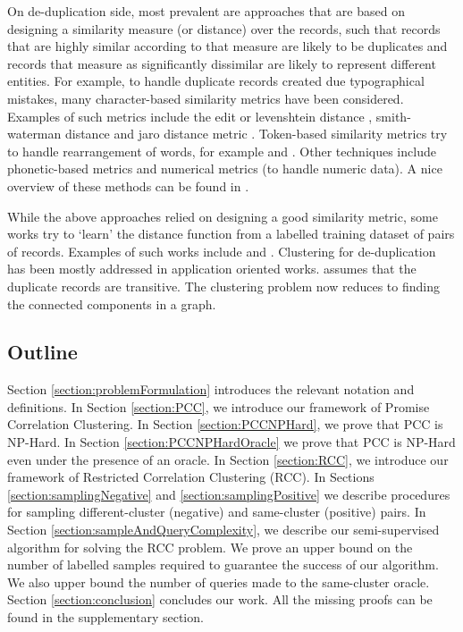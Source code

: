 \documentclass[12pt]{article}
\begin{document}
On de-duplication side, most prevalent are approaches that are based on designing a similarity measure (or distance) over the records, such that records that are highly similar according to that measure are likely to be duplicates and records that measure as significantly dissimilar are likely to represent different entities. For example, to handle duplicate records created due typographical mistakes, many character-based similarity metrics have been considered. Examples of such metrics include the edit or levenshtein distance \cite{levenshtein1966binary}, smith-waterman distance \cite{waterman1981identification} and jaro distance metric \cite{jaro1980unimatch}. Token-based similarity metrics try to handle rearrangement of words, for example \cite{monge1996field} and \cite{cohen1998integration}. Other techniques include phonetic-based metrics and numerical metrics (to handle numeric data). A nice overview of these methods can be found in \cite{elmagarmid2007duplicate}. 
   
While the above approaches relied on designing a good similarity metric, some works try to `learn' the distance function from a labelled training dataset of pairs of records. Examples of such works include \cite{cochinwala2001efficient} and \cite{bilenko2003adaptive}. Clustering for de-duplication has been mostly addressed in application oriented works. \cite{hernandez1995merge} assumes that the duplicate records are transitive. The clustering problem now reduces to finding the connected components in a graph. 

\subsection{Outline}
Section \ref{section:problemFormulation} introduces the relevant notation and definitions. In Section \ref{section:PCC}, we introduce our framework of Promise Correlation Clustering. In Section \ref{section:PCCNPHard}, we prove that PCC is NP-Hard. In Section \ref{section:PCCNPHardOracle} we prove that PCC is NP-Hard even under the presence of an oracle. In Section \ref{section:RCC}, we introduce our framework of Restricted Correlation Clustering (RCC). In Sections \ref{section:samplingNegative} and \ref{section:samplingPositive} we describe procedures for sampling different-cluster (negative) and same-cluster (positive) pairs. In Section \ref{section:sampleAndQueryComplexity}, we describe our semi-supervised algorithm for solving the RCC problem. We prove an upper bound on the number of labelled samples required to guarantee the success of our algorithm. We also upper bound the number of queries made to the same-cluster oracle. Section \ref{section:conclusion} concludes our work. All the missing proofs can be found in the supplementary section. 
\end{document}
